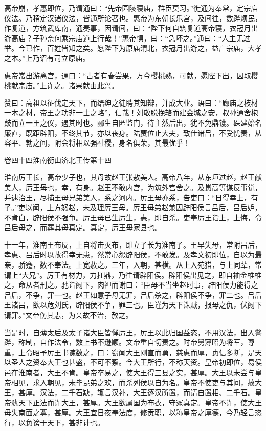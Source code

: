 \documentclass[12pt,UTF8]{ctexbook}
\begin{document}
高帝崩，孝惠即位，乃谓通曰：“先帝园陵寝庙，群臣莫习。”徙通为奉常，定宗庙仪法。乃稍定汉诸仪法，皆通所论著也。惠帝为东朝长乐宫，及间往，数跸烦民，作复道，方筑武库南，通奏事，因请间，曰：“陛下何自筑复道高帝寝，衣冠月出游高庙？子孙奈何乘宗庙道上行哉！”惠帝惧，曰：“急坏之。”通曰：“人主无过举。今已作，百姓皆知之矣。愿陛下为原庙渭北，衣冠月出游之，益广宗庙，大孝之本。”上乃诏有司立原庙。



惠帝常出游离宫，通曰：“古者有春尝果，方今樱桃熟，可献，愿陛下出，因取樱桃献宗庙。”上许之。诸果献由此兴。



赞曰：高祖以征伐定天下，而缙绅之徒聘其知辩，并成大业。语曰：“廊庙之枝材一木之材，帝王之功非一士之略”，信哉！刘敬脱挽辂而建金城之安，叔孙通舍枹鼓而立一王之仪，遇其时也。郦生自匿监门，待主然后出，犹不免鼎镬。硃建始名廉直，既距辟阳，不终其节，亦以丧身。陆贾位止大夫，致仕诸吕，不受忧责，从容平、勃之间，附会将相以强社稷，身名俱荣，其最优乎！





卷四十四淮南衡山济北王传第十四



淮南厉王长，高帝少子也，其母故赵王张敖美人。高帝八年，从东垣过赵，赵王献美人，厉王母也，幸，有身。赵王不敢内宫，为筑外宫舍之。及贯高等谋反事觉，并逮治王，尽捕王母兄弟美人，系之河内。厉王母亦系，告吏曰：“日得幸上，有子。”吏以闻，上方怒赵，未及理厉王母。厉王母弟赵兼因辟阳侯言吕后，吕后妒，不肯白，辟阳侯不强争。厉王母已生厉生，恚，即自杀。吏奉厉王诣上，上悔，令吕后母之，而葬其母真定。真定，厉王母家县也。



十一年，淮南王布反，上自将击灭布，即立子长为淮南子。王早失母，常附吕后，孝惠、吕后时以故得幸无患，然常心怨辟阳侯，不敢发。及孝文初即位，自以为最亲，骄蹇，数不奉法。上宽赦之。三年，入朝，甚横。从上入苑猎，与上同辇，常谓上“大兄”。厉王有材力，力扛鼎，乃往请辟阳侯。辟阳侯出见之，即自袖金椎椎之，命从者刑之。驰诣阙下，肉袒而谢曰：“臣母不当坐赵时事，辟阳侯力能得之吕后，不争，罪一也。赵王如意子母无罪，吕后杀之，辟阳侯不争，罪二也。吕后王诸吕，欲以危刘氏，辟阳侯不争，罪三也。臣谨为天下诛贼，报母之仇，伏阙下请罪。”文帝伤其志，为亲故不治，赦之。



当是时，自薄太后及太子诸大臣皆惮厉王，厉王以此归国益恣，不用汉法，出入警跸，称制，自作法令，数上书不逊顺。文帝重自切责之。时帝舅薄昭为将军，尊重，上令昭予厉王书谏数之，曰：窃闻大王刚直而勇，慈惠而厚，贞信多断，是天以圣人之资奉大王也甚盛，不可不察。今大王所行，不称天资。皇帝初即位，易侯邑在淮南者，大王不肯。皇帝卒易之，使大王得三县之实，甚厚。大王以未尝与皇帝相见，求入朝见，未毕昆弟之欢，而杀列侯以自为名。皇帝不使吏与其间，赦大王，甚厚。汉法，二千石缺，辄言汉补，大王逐汉所置，而请自置相、二千石。皇帝骫天下正法而许大王，甚厚。大王欲属国为布衣，守冢真定。皇帝不许，使大王毋失南面之尊，甚厚。大王宜日夜奉法度，修贡职，以称皇帝之厚德，今乃轻言恣行，以负谤于天下，甚非计也。
\end{document}
